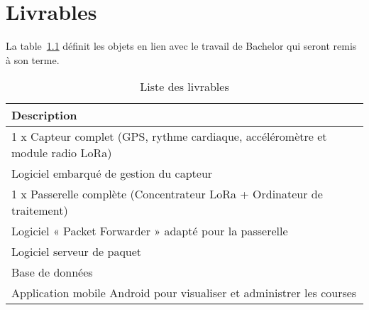 \clearpage
\pagestyle{fancy}
\chapter{Livrables}

La table~\ref{tab:livrables}  définit les objets en lien avec le travail de Bachelor qui seront remis à son terme.

\begin{table}[htb]
\caption[Livrable]{Liste des livrables}
\label{tab:livrables}
\centering
\begin{tabular}{l}
\toprule
Description \\
\midrule
1 x Capteur complet (GPS, rythme cardiaque, accéléromètre et module radio LoRa)  \\
Logiciel embarqué de gestion du capteur \\
1 x Passerelle complète (Concentrateur LoRa + Ordinateur de traitement) \\
Logiciel « Packet Forwarder » adapté pour la passerelle \\
Logiciel serveur de paquet \\
Base de données \\
Application mobile Android pour visualiser et administrer les courses \\
\bottomrule 
\end{tabular}
\end{table}